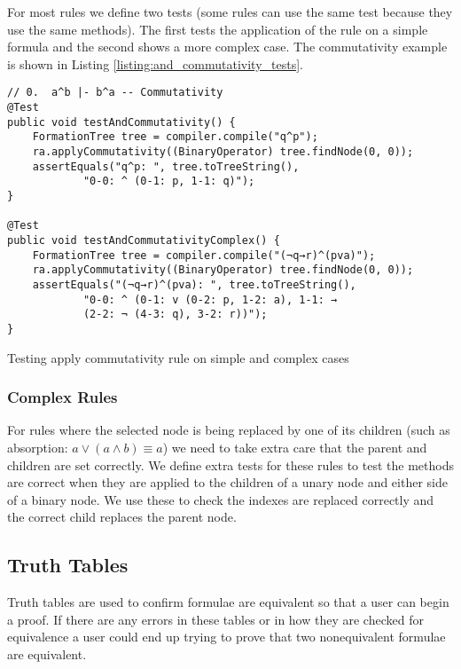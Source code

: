 \documentclass{report}
\begin{document}
For most rules we define two tests (some rules can use the same test because they use the same methods). The first tests the application of the rule on a simple formula and the second shows a more complex case. The commutativity example is shown in Listing \ref{listing:and_commutativity_tests}.

\begin{listing}[ht]
\begin{verbatim}
// 0.  a^b |- b^a -- Commutativity
@Test
public void testAndCommutativity() {
    FormationTree tree = compiler.compile("q^p");
    ra.applyCommutativity((BinaryOperator) tree.findNode(0, 0));
    assertEquals("q^p: ", tree.toTreeString(), 
            "0-0: ^ (0-1: p, 1-1: q)");
}

@Test
public void testAndCommutativityComplex() {
    FormationTree tree = compiler.compile("(¬q→r)^(pva)");
    ra.applyCommutativity((BinaryOperator) tree.findNode(0, 0));
    assertEquals("(¬q→r)^(pva): ", tree.toTreeString(), 
            "0-0: ^ (0-1: v (0-2: p, 1-2: a), 1-1: → 
            (2-2: ¬ (4-3: q), 3-2: r))");
}
\end{verbatim}
\caption{Testing apply commutativity rule on simple and complex cases}
\label{listing:and_commutativity_tests}
\end{listing}

\subsubsection{Complex Rules}

For rules where the selected node is being replaced by one of its children (such as absorption: $a \lor (a \land b) \equiv a$) we need to take extra care that the parent and children are set correctly. We define extra tests for these rules to test the methods are correct when they are applied to the children of a unary node and either side of a binary node. We use these to check the indexes are replaced correctly and the correct child replaces the parent node.

\subsection{Truth Tables}

Truth tables are used to confirm formulae are equivalent so that a user can begin a proof. If there are any errors in these tables or in how they are checked for equivalence a user could end up trying to prove that two nonequivalent formulae are equivalent.
\end{document}
